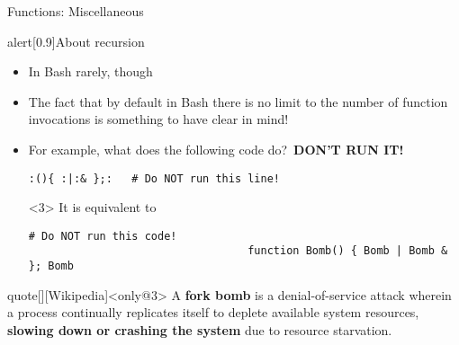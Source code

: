 \begin{frame}[fragile]{Functions: Miscellaneous}
\begin{overlayarea}{\textwidth}{0.7\textheight}
\begin{onlyenv}
\begin{varblock}{alert}[0.9\textwidth]{About recursion}
\begin{itemize}
                    \item In Bash rarely, though
                    \item The fact that by default in Bash there is no limit to the number of function invocations is something to have clear in mind!
                    \item For example, what does the following code do? \,\alert{\textbf{DON'T RUN IT!}}
                          \begin{lstlisting}[style=MyBash, numbers=none, aboveskip=2mm, belowskip=-6mm, xrightmargin=21mm]
                              :(){ :|:& };:   # Do NOT run this line!
                          \end{lstlisting}
                          \begin{uncoverenv}<3>
                              It is equivalent to
                              \begin{lstlisting}[style=MyBash, numbers=none, aboveskip=2mm, belowskip=-5mm, xrightmargin=21mm]
                                  # Do NOT run this code!
                                  function Bomb() { Bomb | Bomb & }; Bomb
                              \end{lstlisting}
                          \end{uncoverenv}
                \end{itemize}
            \end{varblock}
            \vspace{-1mm}
            \begin{varblock}{quote}[\textwidth]{}[Wikipedia]<only@3>
                \small A \textbf{fork bomb} is a denial-of-service attack wherein a process continually replicates itself to deplete available system resources,
                \textbf{slowing down or crashing the system} due to resource starvation.\\[-1.5ex] ~
            \end{varblock}
        \end{onlyenv}
    \end{overlayarea}
\end{frame}
